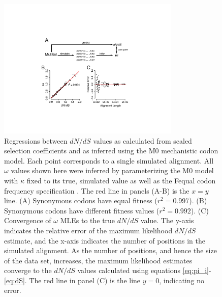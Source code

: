 \documentclass{pnastwo}
\begin{document}
\begin{figure}[htbp]
	\centerline{\includegraphics[width=8.7cm]{figures/MainText/regression_convergence.pdf}}
	\caption{\label{reg_conv} Regressions between $dN/dS$ values as calculated from scaled selection coefficients and as inferred using the M0 mechanistic codon model. Each point corresponds to a single simulated alignment. All $\omega$ values shown here were inferred by parameterizing the M0 model with $\kappa$ fixed to its true, simulated value as well as the Fequal codon frequency specification \cite{Yang2006}. The red line in panels (A-B) is the $x=y$ line. (A) Synonymous codons have equal fitness ($r^2=0.997$). (B) Synonymous codons have different fitness values ($r^2=0.992$). (C) Convergence of $\omega$ MLEs to the true $dN/dS$ value. The y-axis indicates the relative error of the maximum likelihood $dN/dS$ estimate, and the x-axis indicates the number of positions in the simulated alignment. As the number of positions, and hence the size of the data set, increases, the maximum likelihood estimates converge to the $dN/dS$ values calculated using equations \eqref{eq:pi_i}-\eqref{eq:dS}. The red line in panel (C) is the line $y=0$, indicating no error.}
\end{figure}
	
\vspace{2cm}
	
\end{document}
